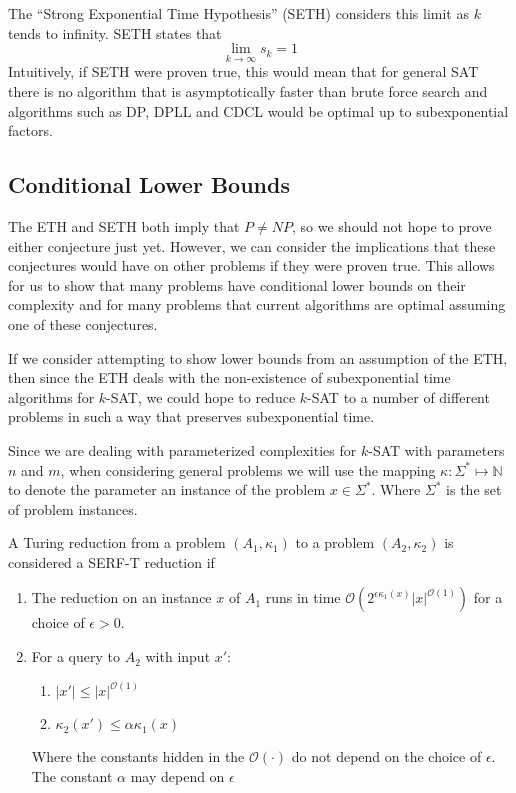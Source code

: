 The ``Strong Exponential Time Hypothesis'' (SETH) considers this limit
as $k$ tends to infinity. SETH states that
\begin{equation} \label{eq:SETH}
    \lim_{k \to \infty} s_{k} = 1
\end{equation}
Intuitively, if SETH were proven true,
this would mean that for general SAT there is no algorithm that is
asymptotically faster than brute force search and algorithms
such as DP, DPLL and CDCL would be optimal up to subexponential factors.

\subsection{Conditional Lower Bounds}
The ETH and SETH both imply that $P \neq NP$, so we should not hope to
prove either conjecture just yet. However, we can consider the implications
that these conjectures would have on other problems if they were proven true.
This allows for us to show that many problems have conditional lower bounds
on their complexity and for many problems that current algorithms
are optimal assuming one of these conjectures.

If we consider attempting to show lower bounds from an assumption of the ETH,
then since the ETH deals with the non-existence of subexponential time algorithms
for $k$-SAT, we could hope to reduce $k$-SAT to a number of different problems in
such a way that preserves subexponential time.

Since we are dealing with parameterized complexities for $k$-SAT with parameters
$n$ and $m$, when considering general problems we will use the mapping
$\kappa: \Sigma^* \mapsto \mathbb{N}$ to denote the parameter an instance
of the problem $x \in \Sigma^*$. Where $\Sigma^*$ is the set of problem instances.

\begin{definition}
    A Turing reduction from a problem $(A_1, \kappa_1)$ to a problem
    $(A_2, \kappa_2)$ is considered a SERF-T reduction if
    \begin{enumerate}
        \item The reduction on an instance $x$ of $A_1$
        runs in time $\mathcal{O}(2^{\epsilon \kappa_1(x)}|x|^{\mathcal{O}(1)})$
        for a choice of $\epsilon > 0$.
        \item For a query to $A_2$ with input $x'$:
        \begin{enumerate}
            \item $|x'| \leq |x|^{\mathcal{O}(1)}$
            \item $\kappa_2(x') \leq \alpha \kappa_1(x)$
        \end{enumerate}
        Where the constants hidden in the $\mathcal{O}(\cdot)$ do not
        depend on the choice of $\epsilon$.
        The constant $\alpha$ may depend on $\epsilon$
    \end{enumerate}
\end{definition}

